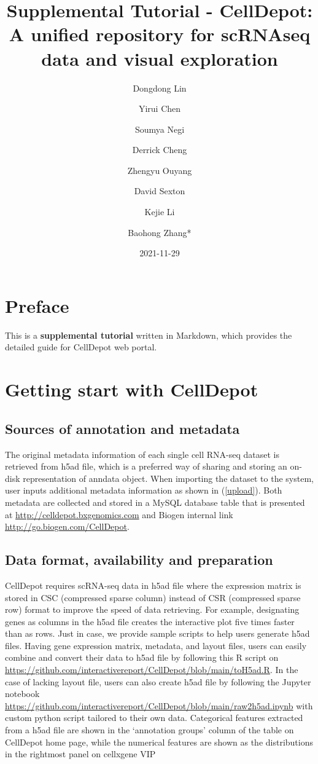 \documentclass[
]{book}
\title{Supplemental Tutorial - CellDepot: A unified repository for scRNAseq data and visual exploration}
\author{Dongdong Lin \and Yirui Chen \and Soumya Negi \and Derrick Cheng \and Zhengyu Ouyang \and David Sexton \and Kejie Li \and Baohong Zhang*}
\date{2021-11-29}
\begin{document}
\maketitle

{
\setcounter{tocdepth}{1}
\tableofcontents
}
\hypertarget{preface}{%
\chapter{Preface}\label{preface}}

This is a \textbf{supplemental tutorial} written in Markdown, which provides the detailed guide for CellDepot web portal.

\hypertarget{getting-start-with-celldepot}{%
\chapter{Getting start with CellDepot}\label{getting-start-with-celldepot}}

\hypertarget{sources-of-annotation-and-metadata}{%
\section{Sources of annotation and metadata}\label{sources-of-annotation-and-metadata}}

The original metadata information of each single cell RNA-seq dataset is retrieved from h5ad file, which is a preferred way of sharing and storing an on-disk representation of anndata object. When importing the dataset to the system, user inputs additional metadata information as shown in (\ref{upload}). Both metadata are collected and stored in a MySQL database table that is presented at \url{http://celldepot.bxgenomics.com} and Biogen internal link \url{http://go.biogen.com/CellDepot}.

\hypertarget{data-format-availability-and-preparation}{%
\section{Data format, availability and preparation}\label{data-format-availability-and-preparation}}

CellDepot requires scRNA-seq data in h5ad file where the expression matrix is stored in CSC (compressed sparse column) instead of CSR (compressed sparse row) format to improve the speed of data retrieving. For example, designating genes as columns in the h5ad file creates the interactive plot five times faster than as rows. Just in case, we provide sample scripts to help users generate h5ad files. Having gene expression matrix, metadata, and layout files, users can easily combine and convert their data to h5ad file by following this R script on \url{https://github.com/interactivereport/CellDepot/blob/main/toH5ad.R}. In the case of lacking layout file, users can also create h5ad file by following the Jupyter notebook \url{https://github.com/interactivereport/CellDepot/blob/main/raw2h5ad.ipynb} with custom python script tailored to their own data. Categorical features extracted from a h5ad file are shown in the `annotation groups' column of the table on CellDepot home page, while the numerical features are shown as the distributions in the rightmost panel on cellxgene VIP
\end{document}
